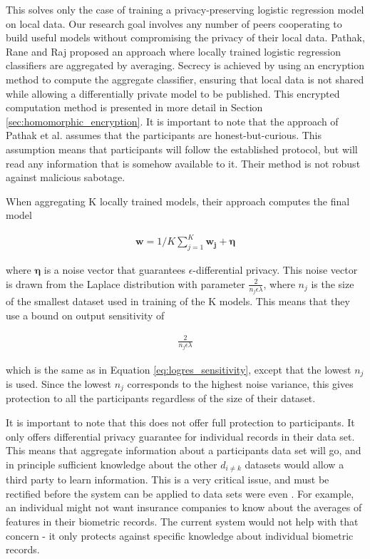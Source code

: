 This solves only the case of training a privacy-preserving logistic regression model on local data. Our research goal involves any number of peers cooperating to build useful models without compromising the privacy of their local data. Pathak, Rane and Raj\cite{pathak2010diffprivhomo} proposed an approach where locally trained logistic regression classifiers are aggregated by averaging. Secrecy is achieved by using an encryption method to compute the aggregate classifier, ensuring that local data is not shared while allowing a differentially private model to be published. This encrypted computation method is presented in more detail in Section \ref{sec:homomorphic_encryption}. It is important to note that the approach of Pathak et al. assumes that the participants are honest-but-curious. This assumption means that participants will follow the established protocol, but will read any information that is somehow available to it. Their method is not robust against malicious sabotage. 

When aggregating K locally trained models, their approach computes the final model

\begin{eqnarray}
\label{eq:parametric_aggregation}
\boldsymbol{w} = 1/K\sum_{j=1}^{K} \boldsymbol{w_j} + \boldsymbol{\eta}
\end{eqnarray}


where $\boldsymbol{\eta}$ is a noise vector that guarantees $\epsilon$-differential privacy. This noise vector is drawn from the Laplace distribution with parameter $\frac{2}{n_j\epsilon\lambda}$, where $n_j$ is the size of the smallest dataset used in training of the K models. This means that they use a bound on output sensitivity of 

\begin{eqnarray}
\label{eq:aggregated_logistic_sensitivity}
\frac{2}{n_j\epsilon\lambda}
\end{eqnarray}


which is the same as in Equation \ref{eq:logres_sensitivity}, except that the lowest $n_j$ is used. Since the lowest $n_j$ corresponds to the highest noise variance, this gives protection to all the participants regardless of the size of their dataset.

It is important to note that this does not offer full protection to participants. It only offers differential privacy guarantee for individual records in their data set. This means that aggregate information about a participants data set will go, and in principle sufficient knowledge about the other $d_{i \neq k}$ datasets would allow a third party to learn information. This is a very critical issue, and must be rectified before the system can be applied to data sets were even . For example, an individual might not want insurance companies to know about the averages of features in their biometric records. The current system would not help with that concern - it only protects against specific knowledge about 
individual biometric records.

